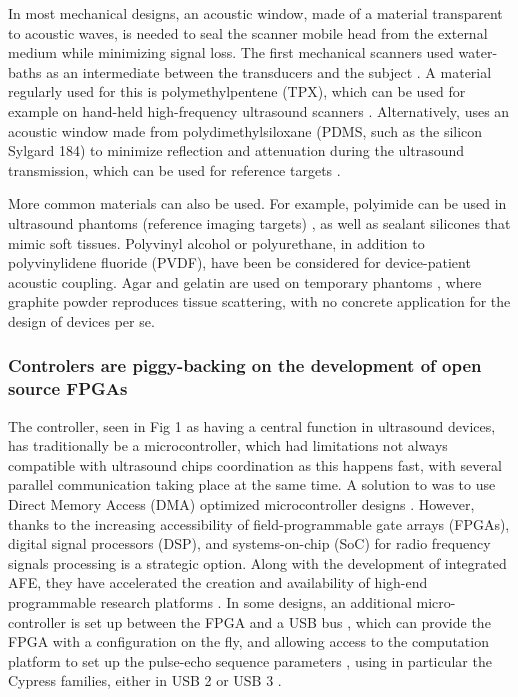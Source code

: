 \documentclass{article}
\begin{document}
In most mechanical designs, an acoustic window, made of a material transparent to acoustic waves, is needed to seal the scanner mobile head from the external medium while minimizing signal loss. The first mechanical scanners used water-baths as an intermediate between the transducers and the subject \cite{schueler_fundamentals_1984}. A material regularly used for this is polymethylpentene (TPX), which can be used for example on hand-held high-frequency ultrasound scanners \cite{erickson_hand-held_2001,brown_low_2013}.  Alternatively, \cite{qiu_ultrasound_2020} uses an acoustic window made from polydimethylsiloxane (PDMS, such as the silicon Sylgard 184) to minimize reflection and
attenuation during the ultrasound transmission, which can be used for reference targets \cite{lorenzo_experimental_2009,melde_holograms_2016}. 

More common materials can also be used. For example, polyimide can be used in ultrasound phantoms (reference imaging targets) \cite{xu_high-frequency_2008, lei_sun_high-frame_2008}, as well as sealant silicones \cite{lorenzo_experimental_2009} that mimic soft tissues. Polyvinyl alcohol or polyurethane, in addition to polyvinylidene fluoride (PVDF), have been be considered \cite{sikdar_novel_2014}  for device-patient acoustic coupling. Agar and gelatin are used on temporary phantoms \cite{vogt_development_2005,chun_ultrasound_2015}, where graphite powder reproduces tissue scattering, with no concrete application for the design of devices per se. 

\subsubsection{Controlers are piggy-backing on the development of open source FPGAs}

The controller, seen in Fig 1 as having a central function in ultrasound devices, has traditionally be a microcontroller, which had limitations not always compatible with ultrasound chips coordination as this happens fast, with several parallel communication taking place at the same time. A solution to was to use Direct Memory Access (DMA) optimized microcontroller designs \cite{kidav_architecture_2019}. However, thanks to the increasing accessibility of field-programmable gate arrays (FPGAs), digital signal processors (DSP), and systems-on-chip (SoC) for radio frequency signals processing is a strategic option. Along with the development of integrated AFE, they have accelerated the creation and availability of high-end programmable research platforms  \cite{roman_open-source_2018}.  In some designs, an additional micro-controller is set up between the FPGA and a USB bus \cite{pashaei_live_2018, schneider_fully_2010}, which can provide the FPGA with a configuration on the fly, and allowing access to the computation platform to set up the pulse-echo sequence parameters \cite{raj_microcontroller_2017, raj_8051_2016}, using in particular the Cypress families, either in USB 2 \cite{hu_design_2011,richard_low-cost_2008} or USB 3 \cite{lewandowski_low-cost_2012,qiu_delayed-excitation_2018,qiu_ultrasound_2020,ahn_smartphone-based_2015}.
\end{document}
